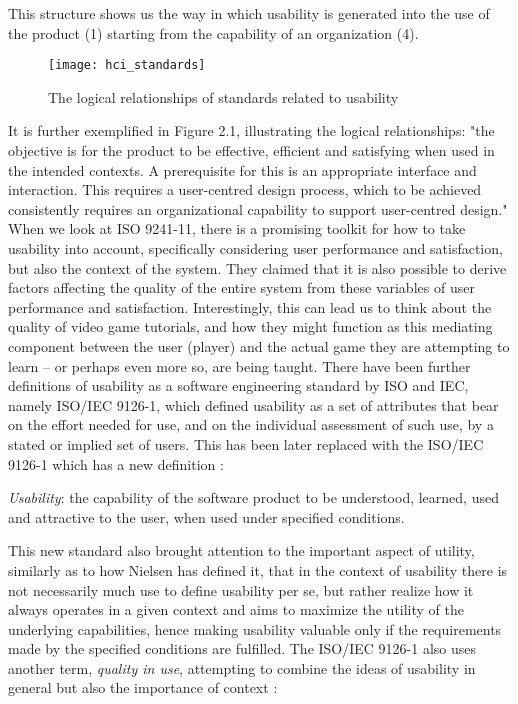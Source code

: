 This structure shows us the way in which usability is generated into the use of the product (1) starting from the capability of an organization (4). 

\begin{figure}[h]
	\centering
	\texttt{[image: hci\_standards]}
	\caption{The logical relationships of standards related to usability \cite{Bevan2006}}
\end{figure}

It is further exemplified in Figure 2.1, illustrating the logical relationships: "the objective is for the product to be effective, efficient and satisfying when used in the intended contexts. A prerequisite for this is an appropriate interface and interaction. This requires a user-centred design process, which to be achieved consistently requires an organizational capability to support user-centred design." \cite{Bevan2006} When we look at ISO 9241-11, there is a promising toolkit for how to take usability into account, specifically considering user performance and satisfaction, but also the context of the system. They claimed that it is also possible to derive factors affecting the quality of the entire system from these variables of user performance and satisfaction. \cite{Bevan2006} Interestingly, this can lead us to think about the quality of video game tutorials, and how they might function as this mediating component between the user (player) and the actual game they are attempting to learn -- or perhaps even more so, are being taught. There have been further definitions of usability as a software engineering standard by ISO and IEC, namely ISO/IEC 9126-1, which defined usability as a set of attributes that bear on the effort needed for use, and on the individual assessment of such use, by a stated or implied set of users. \cite{Bevan2006} This has been later replaced with the ISO/IEC 9126-1 which has a new definition \cite{Bevan2006}:

\begin{displayquote}
	
	\textit{Usability}: the capability of the software product to be understood, learned, used and attractive to the user, when used under specified conditions.
	
\end{displayquote}

This new standard also brought attention to the important aspect of utility, similarly as to how Nielsen has defined it, that in the context of usability there is not necessarily much use to define usability per se, but rather realize how it always operates in a given context and aims to maximize the utility of the underlying capabilities, hence making usability valuable only if the requirements made by the specified conditions are fulfilled. The ISO/IEC 9126-1 also uses another term, \textit{quality in use}, attempting to combine the ideas of usability in general but also the importance of context \cite{Bevan2006}:

